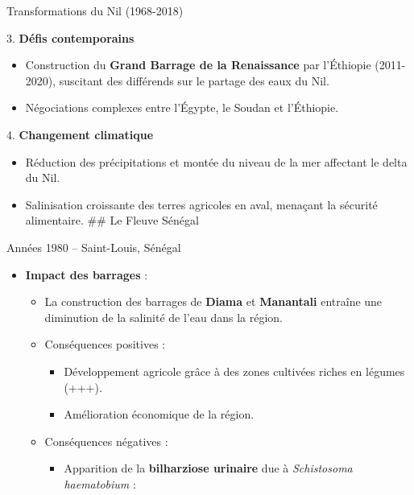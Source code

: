 \documentclass[
  ignorenonframetext,
]{beamer}
\providecommand{\tightlist}{%
  \setlength{\itemsep}{0pt}\setlength{\parskip}{0pt}}\usepackage{longtable,booktabs,array}
\begin{document}
\begin{frame}
\begin{block}{Transformations du Nil (1968-2018)}
\begin{block}{3. \textbf{Défis contemporains}}
\begin{itemize}
  \begin{itemize}
  \tightlist
  \item
    Construction du \textbf{Grand Barrage de la Renaissance} par
    l'Éthiopie (2011-2020), suscitant des différends sur le partage des
    eaux du Nil.
  \item
    Négociations complexes entre l'Égypte, le Soudan et l'Éthiopie.
  \end{itemize}
\end{itemize}
\end{block}

\begin{block}{4. \textbf{Changement climatique}}
\protect\hypertarget{changement-climatique}{}
\begin{itemize}
\tightlist
\item
  Réduction des précipitations et montée du niveau de la mer affectant
  le delta du Nil.
\item
  Salinisation croissante des terres agricoles en aval, menaçant la
  sécurité alimentaire. \#\# Le Fleuve Sénégal
\end{itemize}
\end{block}
\end{block}

\begin{block}{Années 1980 -- Saint-Louis, Sénégal}
\protect\hypertarget{annuxe9es-1980-saint-louis-suxe9nuxe9gal}{}
\begin{itemize}
\tightlist
\item
  \textbf{Impact des barrages} :

  \begin{itemize}
  \tightlist
  \item
    La construction des barrages de \textbf{Diama} et \textbf{Manantali}
    entraîne une diminution de la salinité de l'eau dans la région.
  \item
    Conséquences positives :

    \begin{itemize}
    \tightlist
    \item
      Développement agricole grâce à des zones cultivées riches en
      légumes (+++).
    \item
      Amélioration économique de la région.
    \end{itemize}
  \item
    Conséquences négatives :

    \begin{itemize}
    \tightlist
    \item
      Apparition de la \textbf{bilharziose urinaire} due à
      \emph{Schistosoma haematobium} :


\end{itemize}
\end{itemize}
\end{itemize}
\end{block}
\end{frame}
\end{document}
